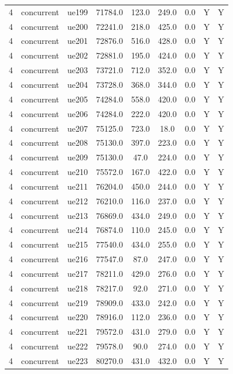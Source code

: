 \begin{table}[ht]
\begin{tabular}{|c|c|c|c|c|c|c|c|c|}
4 & concurrent & ue199 & 71784.0 & 123.0 & 249.0 & 0.0 & Y & Y \\
4 & concurrent & ue200 & 72241.0 & 218.0 & 425.0 & 0.0 & Y & Y \\
4 & concurrent & ue201 & 72876.0 & 516.0 & 428.0 & 0.0 & Y & Y \\
4 & concurrent & ue202 & 72881.0 & 195.0 & 424.0 & 0.0 & Y & Y \\
4 & concurrent & ue203 & 73721.0 & 712.0 & 352.0 & 0.0 & Y & Y \\
4 & concurrent & ue204 & 73728.0 & 368.0 & 344.0 & 0.0 & Y & Y \\
4 & concurrent & ue205 & 74284.0 & 558.0 & 420.0 & 0.0 & Y & Y \\
4 & concurrent & ue206 & 74284.0 & 222.0 & 420.0 & 0.0 & Y & Y \\
4 & concurrent & ue207 & 75125.0 & 723.0 & 18.0 & 0.0 & Y & Y \\
4 & concurrent & ue208 & 75130.0 & 397.0 & 223.0 & 0.0 & Y & Y \\
4 & concurrent & ue209 & 75130.0 & 47.0 & 224.0 & 0.0 & Y & Y \\
4 & concurrent & ue210 & 75572.0 & 167.0 & 422.0 & 0.0 & Y & Y \\
4 & concurrent & ue211 & 76204.0 & 450.0 & 244.0 & 0.0 & Y & Y \\
4 & concurrent & ue212 & 76210.0 & 116.0 & 237.0 & 0.0 & Y & Y \\
4 & concurrent & ue213 & 76869.0 & 434.0 & 249.0 & 0.0 & Y & Y \\
4 & concurrent & ue214 & 76874.0 & 110.0 & 245.0 & 0.0 & Y & Y \\
4 & concurrent & ue215 & 77540.0 & 434.0 & 255.0 & 0.0 & Y & Y \\
4 & concurrent & ue216 & 77547.0 & 87.0 & 247.0 & 0.0 & Y & Y \\
4 & concurrent & ue217 & 78211.0 & 429.0 & 276.0 & 0.0 & Y & Y \\
4 & concurrent & ue218 & 78217.0 & 92.0 & 271.0 & 0.0 & Y & Y \\
4 & concurrent & ue219 & 78909.0 & 433.0 & 242.0 & 0.0 & Y & Y \\
4 & concurrent & ue220 & 78916.0 & 112.0 & 236.0 & 0.0 & Y & Y \\
4 & concurrent & ue221 & 79572.0 & 431.0 & 279.0 & 0.0 & Y & Y \\
4 & concurrent & ue222 & 79578.0 & 90.0 & 274.0 & 0.0 & Y & Y \\
4 & concurrent & ue223 & 80270.0 & 431.0 & 432.0 & 0.0 & Y & Y \\

\end{tabular}
\end{table}
